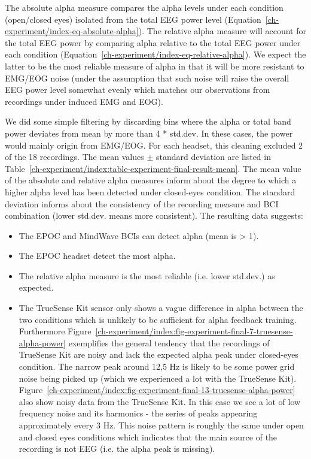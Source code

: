 \documentclass[a4paper,10pt,english,lof,lot,twoside]{puthesis}
\begin{document}
The absolute alpha measure compares the alpha levels under each condition
(open/closed eyes) isolated from the total EEG power level (Equation \eqref{ch-experiment/index-eq-absolute-alpha}). The relative alpha measure will account for the total
EEG power by comparing alpha relative to the total EEG power under each
condition (Equation \eqref{ch-experiment/index-eq-relative-alpha}). We expect the latter to be the most
reliable measure of alpha in that it will be more resistant to EMG/EOG noise
(under the assumption that such noise will raise the overall EEG power level
somewhat evenly which matches our observations from recordings under induced EMG
and EOG).

We did some simple filtering by discarding bins where the alpha or total band
power deviates from mean by more than 4 * std.dev.  In these cases, the power
would mainly origin from EMG/EOG. For each headset, this cleaning excluded 2 of
the 18 recordings.  The mean values \(\pm\) standard deviation are listed in Table \ref{ch-experiment/index:table-experiment-final-result-mean}. The mean value of the absolute
and relative alpha measures inform about the degree to which a higher alpha
level has been detected under closed-eyes condition.  The standard deviation
informs about the consistency of the recording measure and BCI combination
(lower std.dev. means more consistent).  The resulting data suggests:
\begin{itemize}
\item {} 
The EPOC and MindWave BCIs can detect alpha (mean is \textgreater{} 1).

\item {} 
The EPOC headset detect the most alpha.

\item {} 
The relative alpha measure is the most reliable (i.e. lower std.dev.) as
expected.

\item {} 
The TrueSense Kit sensor only shows a vague difference in alpha between the
two conditions which is unlikely to be
sufficient for alpha feedback training. Furthermore Figure \ref{ch-experiment/index:fig-experiment-final-7-truesense-alpha-power} exemplifies the general tendency that
the recordings of TrueSense Kit are noisy and lack the expected alpha peak
under closed-eyes condition. The narrow peak around 12,5 Hz is likely to be
some power grid noise being picked up (which we experienced a lot with the
TrueSense Kit). Figure \ref{ch-experiment/index:fig-experiment-final-13-truesense-alpha-power} also
show noisy data from the TrueSense Kit. In this case we see a lot of
low frequency noise and its harmonics - the series of peaks appearing approximately
every 3 Hz. This noise pattern is roughly the same under
open and closed eyes conditions which indicates that the main source of the
recording is not EEG (i.e. the alpha peak is missing).

\end{itemize}
\end{document}
